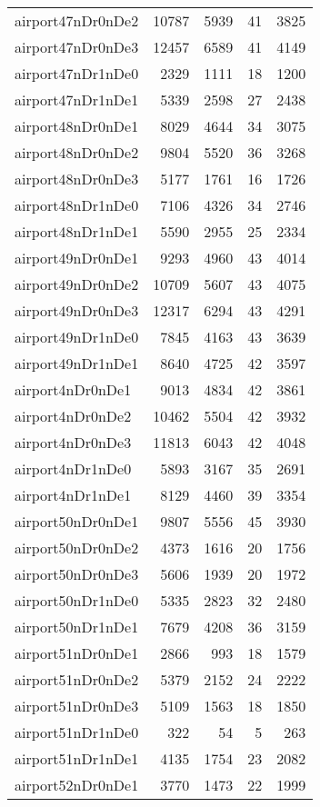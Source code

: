\begin{longtable}{lrrrr}
airport47nDr0nDe2 & 10787 & 5939 & 41 & 3825 \\
airport47nDr0nDe3 & 12457 & 6589 & 41 & 4149 \\
airport47nDr1nDe0 & 2329 & 1111 & 18 & 1200 \\
airport47nDr1nDe1 & 5339 & 2598 & 27 & 2438 \\
airport48nDr0nDe1 & 8029 & 4644 & 34 & 3075 \\
airport48nDr0nDe2 & 9804 & 5520 & 36 & 3268 \\
airport48nDr0nDe3 & 5177 & 1761 & 16 & 1726 \\
airport48nDr1nDe0 & 7106 & 4326 & 34 & 2746 \\
airport48nDr1nDe1 & 5590 & 2955 & 25 & 2334 \\
airport49nDr0nDe1 & 9293 & 4960 & 43 & 4014 \\
airport49nDr0nDe2 & 10709 & 5607 & 43 & 4075 \\
airport49nDr0nDe3 & 12317 & 6294 & 43 & 4291 \\
airport49nDr1nDe0 & 7845 & 4163 & 43 & 3639 \\
airport49nDr1nDe1 & 8640 & 4725 & 42 & 3597 \\
airport4nDr0nDe1 & 9013 & 4834 & 42 & 3861 \\
airport4nDr0nDe2 & 10462 & 5504 & 42 & 3932 \\
airport4nDr0nDe3 & 11813 & 6043 & 42 & 4048 \\
airport4nDr1nDe0 & 5893 & 3167 & 35 & 2691 \\
airport4nDr1nDe1 & 8129 & 4460 & 39 & 3354 \\
airport50nDr0nDe1 & 9807 & 5556 & 45 & 3930 \\
airport50nDr0nDe2 & 4373 & 1616 & 20 & 1756 \\
airport50nDr0nDe3 & 5606 & 1939 & 20 & 1972 \\
airport50nDr1nDe0 & 5335 & 2823 & 32 & 2480 \\
airport50nDr1nDe1 & 7679 & 4208 & 36 & 3159 \\
airport51nDr0nDe1 & 2866 & 993 & 18 & 1579 \\
airport51nDr0nDe2 & 5379 & 2152 & 24 & 2222 \\
airport51nDr0nDe3 & 5109 & 1563 & 18 & 1850 \\
airport51nDr1nDe0 & 322 & 54 & 5 & 263 \\
airport51nDr1nDe1 & 4135 & 1754 & 23 & 2082 \\
airport52nDr0nDe1 & 3770 & 1473 & 22 & 1999 \\

\end{longtable}
